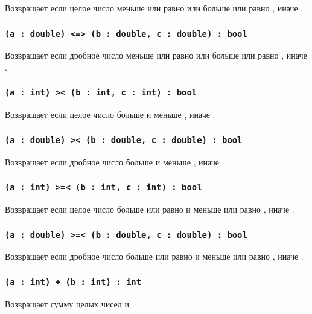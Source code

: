 Возвращает \true{} если целое число  меньше или равно  или больше или равно , иначе \false{}.

\subsubsection{\lstinline|(a : double) <=> (b : double, c : double) : bool|}

Возвращает \true{} если дробное число  меньше или равно  или больше или равно , иначе \false{}.

\subsubsection{\lstinline|(a : int) >< (b : int, c : int) : bool|}

Возвращает \true{} если целое число  больше  и меньше , иначе \false{}.

\subsubsection{\lstinline|(a : double) >< (b : double, c : double) : bool|}

Возвращает \true{} если дробное число  больше  и меньше , иначе \false{}.

\subsubsection{\lstinline|(a : int) >=< (b : int, c : int) : bool|}

Возвращает \true{} если целое число  больше или равно  и меньше или равно , иначе \false{}.

\subsubsection{\lstinline|(a : double) >=< (b : double, c : double) : bool|}

Возвращает \true{} если дробное число  больше или равно  и меньше или равно , иначе \false{}.


\subsubsection{\lstinline|(a : int) + (b : int) : int|}

Возвращает сумму целых чисел  и .

